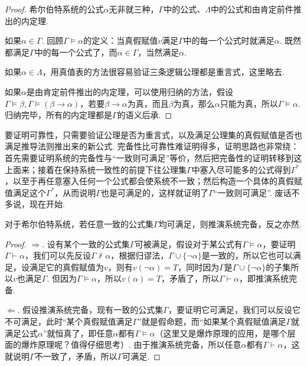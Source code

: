 \begin{proof}
    希尔伯特系统的公式\(\alpha\)无非就三种，\(\Gamma\)中的公式、\(\Lambda\)中的公式和由肯定前件推出的内定理.

    如果\(\alpha \in \Gamma\). 回顾\(\Gamma \vDash \alpha\)的定义：当真假赋值\(v\)满足\(\Gamma\)中的每一个公式时就满足\(\alpha\). 既然都满足\(\Gamma\)中的每一个公式了，而\(\alpha \in \Gamma\)，当然满足\(\alpha\).
    
    如果\(\alpha \in \Lambda\)，用真值表的方法很容易验证三条逻辑公理都是重言式，这里略去.

    如果\(\alpha\)是由肯定前件推出的内定理，可以使用归纳的方法，假设\(\Gamma \vDash \beta, \Gamma \vDash (\beta \to \alpha)\)，若要\(\beta \to \alpha\)为真，而且\(\beta\)为真，那么\(\alpha\)只能为真，所以\(\Gamma \vDash \alpha\). 归纳完毕，所有的内定理都是\(\Gamma\)的语义后承.
\end{proof}


\vspace{1cm}

要证明可靠性，只需要验证公理是否为重言式，以及满足公理集的真假赋值是否也满足推导法则推出来的新公式. 完备性比可靠性难证明得多，证明思路也非常绕：首先需要证明系统的完备性与“一致则可满足”等价，然后把完备性的证明转移到这上面来；接着在保持系统一致性的前提下往公理集\(\Gamma\)中塞入尽可能多的公式得到\(\Gamma^*\)，以至于再任意塞入任何一个公式都会使系统不一致；然后构造一个具体的真假赋值满足这个\(\Gamma^*\)，从而说明\(\Gamma\)也是可满足的，这样就证明了\(\Gamma\)“一致则可满足”. 废话不多说，现在开始.

\begin{lemma}{}
    对于希尔伯特系统，若任意一致的公式集$\Gamma$均可满足，则推演系统完备，反之亦然. 
\end{lemma}

\begin{proof}
    $\Rightarrow$. 设有某个一致的公式集$\Gamma$可被满足，假设对于某公式有$\Gamma \vDash \alpha$，要证明$\Gamma \vdash \alpha$，我们可以先反设$\Gamma \not \vdash \alpha$，根据归谬法，$\Gamma \cup \{\neg \alpha\}$是一致的，所以它也可以满足，设满足它的真假赋值为$v$，则有$v(\neg\alpha)=T$，同时因为$\Gamma$是$\Gamma \cup \{\neg \alpha\}$的子集所以$v$也满足$\Gamma$. 但因为$\Gamma \vDash \alpha$，所以$v(\alpha)=T$，矛盾了，所以$\Gamma \vdash \alpha$，即推演系统完备.

    $\Leftarrow$.  假设推演系统完备，现有一致的公式集$\Gamma$，要证明它可满足，我们可以反设它不可满足，此时“某个真假赋值满足$\Gamma$”就是假命题，而“如果某个真假赋值满足$\Gamma$就满足公式$\alpha$”就恒真了，即任意$\alpha$都有$\Gamma \vDash \alpha$（这里又是爆炸原理的应用，是哪个层面的爆炸原理呢？值得仔细思考）. 由于推演系统完备，所以任意$\alpha$都有$\Gamma \vdash \alpha$，这就说明$\Gamma$不一致了，矛盾，所以$\Gamma$可满足.
\end{proof}

